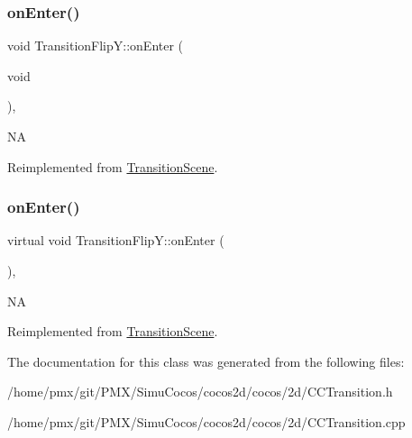 \subsubsection{\texorpdfstring{on\+Enter()}{onEnter()}\hspace{0.1cm}{\footnotesize\ttfamily [1/2]}}
{\footnotesize\ttfamily void Transition\+Flip\+Y\+::on\+Enter (\begin{DoxyParamCaption}\item[{void}]{ }\end{DoxyParamCaption})\hspace{0.3cm}{\ttfamily [override]}, {\ttfamily [virtual]}}

NA 

Reimplemented from \hyperlink{classTransitionScene_aace390a1bd8f3c73bb650a1e256a0f83}{Transition\+Scene}.

\mbox{\label{classTransitionFlipY_a55d7608988c869dc431bf2cff7601aaa}} 
\subsubsection{\texorpdfstring{on\+Enter()}{onEnter()}\hspace{0.1cm}{\footnotesize\ttfamily [2/2]}}
{\footnotesize\ttfamily virtual void Transition\+Flip\+Y\+::on\+Enter (\begin{DoxyParamCaption}{ }\end{DoxyParamCaption})\hspace{0.3cm}{\ttfamily [override]}, {\ttfamily [virtual]}}

NA 

Reimplemented from \hyperlink{classTransitionScene_aace390a1bd8f3c73bb650a1e256a0f83}{Transition\+Scene}.



The documentation for this class was generated from the following files\+:\begin{DoxyCompactItemize}
\item 
/home/pmx/git/\+P\+M\+X/\+Simu\+Cocos/cocos2d/cocos/2d/C\+C\+Transition.\+h\item 
/home/pmx/git/\+P\+M\+X/\+Simu\+Cocos/cocos2d/cocos/2d/C\+C\+Transition.\+cpp\end{DoxyCompactItemize}
